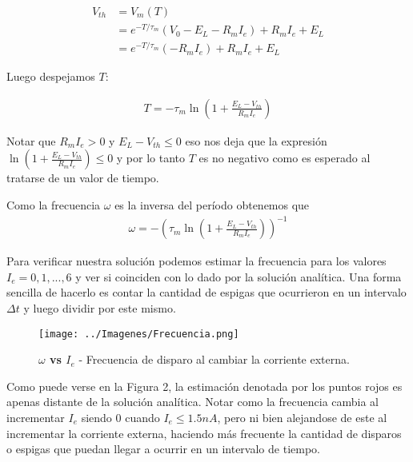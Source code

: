 \documentclass[10pt,journal,compsoc]{IEEEtran}
\begin{document}
\begin{equation*}
  \begin{aligned}
    V_{th} 
      &= V_m(T) \\
      &= e^{-T/\tau_m}(V_0 - E_L - R_m I_e) + R_m I_e + E_L \\
      &= e^{-T/\tau_m}(-R_m I_e) + R_m I_e + E_L
  \end{aligned}
\end{equation*}

Luego despejamos $T$:

\begin{equation*}
  \begin{aligned}
    T = -\tau_m \ln \left(1 + \frac{E_L - V_{th}}{R_m I_e} \right)
  \end{aligned}
\end{equation*}

Notar que $R_m I_e > 0$ y $E_L - V_{th} \leq 0$ eso nos deja que la expresión
$\ln \left(1 + \frac{E_L - V_{th}}{R_m I_e} \right) \leq 0$ y por lo tanto $T$
es no negativo como es esperado al tratarse de un valor de tiempo.

Como la frecuencia $\omega$ es la inversa del período obtenemos que
\begin{equation*}
  \begin{aligned}
    \omega = -\left(\tau_m \ln \left(1 + \frac{E_L - V_{th}}{R_m I_e} \right)\right)^{-1}
  \end{aligned}
\end{equation*}

Para verificar nuestra solución podemos estimar la frecuencia para los valores
$I_e = 0, 1, ..., 6$ y ver si coinciden con lo dado por la solución analítica.
Una forma sencilla de hacerlo es contar la cantidad de espigas que ocurrieron en
un intervalo $\Delta t$ y luego dividir por este mismo.

\begin{figure}[!t]
  \centering
  \texttt{[image: ../Imagenes/Frecuencia.png]}
  \caption{\textbf{$\omega$ vs $I_e$} - Frecuencia de disparo al cambiar la
  corriente externa.}
  \label{fig_sim}
\end{figure}

Como puede verse en la Figura 2, la estimación denotada por los puntos rojos es
apenas distante de la solución analítica. Notar como la frecuencia cambia al
incrementar $I_e$ siendo 0 cuando $I_e \leq 1.5nA$, pero ni bien alejandose de
este al incrementar la corriente externa, haciendo más frecuente la cantidad de
disparos o espigas que puedan llegar a ocurrir en un intervalo de tiempo.
\end{document}
